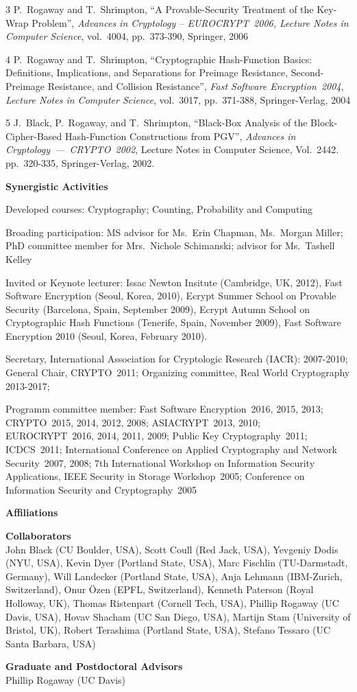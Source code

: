 \documentclass{article}[11pt]
\newcommand{\drop}{\protect{\vspace{1.2ex}}}
\newlength{\headwidth}
\newlength{\sepwidth}
\newlength{\itemwidth}
\newcommand{\resitem}[2]{\noindent\vspace{.15in}\parbox[t]{\headwidth}{\bf{#1}}\hspace{\sepwidth}\parbox[t]{\itemwidth}{#2}}
\newcommand{\pf}{\it}
\begin{document}
\begin{noindent}
{\drop
\num{3}
P.\ Rogaway and T.\ Shrimpton, ``A Provable-Security Treatment of the
Key-Wrap Problem'', {\pf Advances in Cryptology -- EUROCRYPT~2006,
Lecture Notes in Computer Science}, vol.\ 4004, pp.\ 373-390,
Springer, 2006

\drop
\num{4}
P.\ Rogaway and T.\ Shrimpton, ``Cryptographic Hash-Function Basics:
Definitions, Implications, and Separations for Preimage Resistance,
Second-Preimage Resistance, and Collision Resistance'', {\pf  Fast
Software Encryption~2004, Lecture Notes in Computer Science}, vol.\
3017, pp.\ 371-388, Springer-Verlag, 2004

\drop
\num{5}
J.~Black, P.~Rogaway, and T.~Shrimpton,
``Black-Box  Analysis of the Block-Cipher-Based Hash-Function Constructions
from PGV'',
{\pf Advances in Cryptology~---~CRYPTO~2002}, Lecture Notes in Computer
Science, Vol.~2442. pp.\ 320-335, Springer-Verlag, 2002.
}


\resitem{Synergistic Activities}{ 
Developed courses: Cryptography; Counting, Probability and Computing

\drop
Broading participation: MS advisor for Ms.\ Erin Chapman, Ms.\ Morgan Miller; PhD committee member for Mrs.\ Nichole Schimanski; advisor for Ms.\ Tashell Kelley

\drop
Invited or Keynote lecturer: Issac Newton Insitute (Cambridge, UK, 2012), Fast Software Encryption (Seoul, Korea, 2010), Ecrypt Summer School on Provable Security (Barcelona, Spain, September 2009), Ecrypt Autumn School on Cryptographic Hash Functions (Tenerife, Spain, November 2009), Fast Software Encryption 2010 (Seoul, Korea, February 2010).

\drop
Secretary, International Association for Cryptologic Research (IACR): 2007-2010;
General Chair, CRYPTO~2011;
Organizing committee, Real World Cryptography 2013-2017;

Programm committee member:
Fast Software Encryption~2016, 2015, 2013;
CRYPTO~2015, 2014, 2012, 2008;
ASIACRYPT~2013, 2010;
EUROCRYPT~2016, 2014, 2011, 2009;
Public Key Cryptography~2011;
ICDCS~2011;
International Conference on Applied Cryptography and Network
Security~2007, 2008;  
7th International Workshop on Information Security Applications, 
IEEE Security in Storage Workshop~2005;
Conference on Information Security and Cryptography~2005
}

\resitem{Affiliations}{
{\bf Collaborators}\\
John Black (CU Boulder, USA),
Scott Coull (Red Jack, USA),
Yevgeniy Dodis (NYU, USA),
Kevin Dyer (Portland State, USA),
Marc Fischlin (TU-Darmstadt, Germany),
Will Landecker (Portland State, USA),
Anja Lehmann (IBM-Zurich, Switzerland),
Onur \"{O}zen (EPFL, Switzerland),
Kenneth Paterson (Royal Holloway, UK),
Thomas Ristenpart (Cornell Tech, USA),
Phillip Rogaway (UC Davis, USA),
Hovav Shacham (UC San Diego, USA),
Martijn Stam (University of Bristol, UK),
Robert Terashima (Portland State, USA),
Stefano Tessaro (UC Santa Barbara, USA)

\drop
{\bf Graduate and Postdoctoral Advisors}\\
Phillip Rogaway (UC Davis)
}


\end{noindent}
\end{document}
